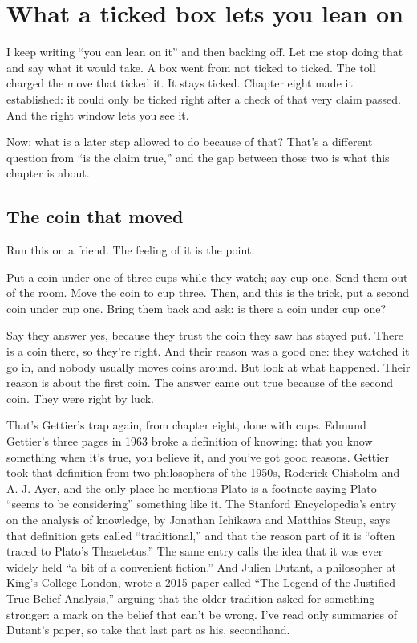 \documentclass[11pt,twoside]{article}
\theoremstyle{thielethm}
\theoremstyle{thieledef}
\theoremstyle{thieledef}
\theoremstyle{thieledef}
\theoremstyle{thielethm}
\theoremstyle{thieleobs}
\theoremstyle{thielethm}
\begin{document}
\section{What a ticked box lets you lean on}
\label{sec:lean-on}

I keep writing ``you can lean on it'' and then backing off. Let me stop doing that and say what it would take. A box went from not ticked to ticked. The toll charged the move that ticked it. It stays ticked. Chapter eight made it established: it could only be ticked right after a check of that very claim passed. And the right window lets you see it.

Now: what is a later step allowed to do because of that? That's a different question from ``is the claim true,'' and the gap between those two is what this chapter is about.

\subsection{The coin that moved}

Run this on a friend. The feeling of it is the point.

Put a coin under one of three cups while they watch; say cup one. Send them out of the room. Move the coin to cup three. Then, and this is the trick, put a second coin under cup one. Bring them back and ask: is there a coin under cup one?

Say they answer yes, because they trust the coin they saw has stayed put. There is a coin there, so they're right. And their reason was a good one: they watched it go in, and nobody usually moves coins around. But look at what happened. Their reason is about the first coin. The answer came out true because of the second coin. They were right by luck.

That's Gettier's trap again, from chapter eight, done with cups. Edmund Gettier's three pages in 1963 broke a definition of knowing: that you know something when it's true, you believe it, and you've got good reasons. Gettier took that definition from two philosophers of the 1950s, Roderick Chisholm and A. J. Ayer, and the only place he mentions Plato is a footnote saying Plato ``seems to be considering'' something like it. The Stanford Encyclopedia's entry on the analysis of knowledge, by Jonathan Ichikawa and Matthias Steup, says that definition gets called ``traditional,'' and that the reason part of it is ``often traced to Plato's Theaetetus.'' The same entry calls the idea that it was ever widely held ``a bit of a convenient fiction.'' And Julien Dutant, a philosopher at King's College London, wrote a 2015 paper called ``The Legend of the Justified True Belief Analysis,'' arguing that the older tradition asked for something stronger: a mark on the belief that can't be wrong. I've read only summaries of Dutant's paper, so take that last part as his, secondhand.
\end{document}
